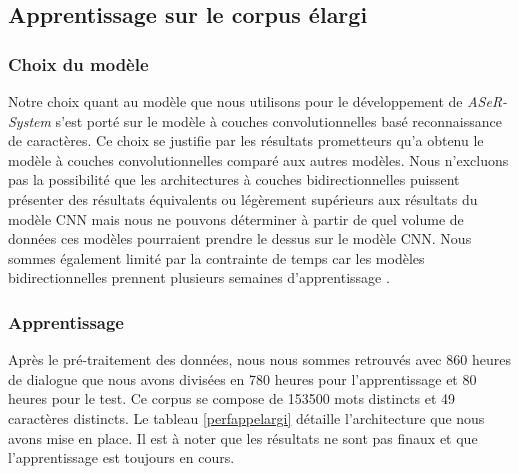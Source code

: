 \subsection{Apprentissage sur le corpus élargi}
\subsubsection{Choix du modèle}
Notre choix quant au modèle que nous utilisons pour le développement de \textit{ASeR-System} s'est porté sur le modèle à couches convolutionnelles basé reconnaissance de caractères. Ce choix se justifie par les résultats prometteurs qu'a obtenu le modèle à couches convolutionnelles comparé aux autres modèles. Nous n'excluons pas la possibilité que les architectures à couches bidirectionnelles puissent présenter des résultats équivalents ou légèrement supérieurs aux résultats du modèle CNN mais nous ne pouvons déterminer à partir de quel volume de données ces modèles pourraient prendre le dessus sur le modèle CNN. Nous sommes également limité par la contrainte de temps car les modèles bidirectionnelles prennent plusieurs semaines d'apprentissage \cite{e2e4}.


\subsubsection{Apprentissage}
Après le pré-traitement des données, nous nous sommes retrouvés avec 860 heures de dialogue que nous avons divisées en 780 heures pour l'apprentissage et 80 heures pour le test. Ce corpus se compose de 153500 mots distincts et 49 caractères distincts. Le tableau \ref{perfappelargi} détaille l'architecture que nous avons mise en place. Il est à noter que les résultats ne sont pas finaux et que l'apprentissage est toujours en cours.

\begin{center}
\centering
    \begin{table}[H]
    \caption{Performance apprentissage modèle CNN sur le corpus élargi}
    \end{table}
\end{center}
\FloatBarrier

